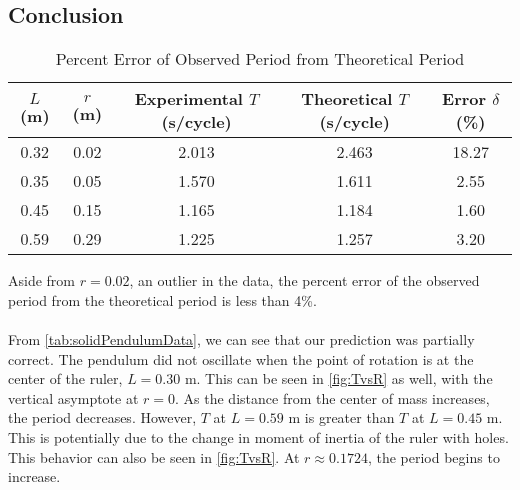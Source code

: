 \documentclass[article, 12pt]{article}
\begin{document}
\subsection{Conclusion}
\begin{table}[H]
    \centering
    \begin{tabular}{|c|c|c|c|c|}
        \hline
        $L$ (m) & $r$ (m) & Experimental $T$ (s/cycle) & Theoretical $T$ (s/cycle) & Error $\delta$ (\%) \\
        \hline
        0.32 & 0.02 & 2.013 & 2.463 & 18.27 \\
        0.35 & 0.05 & 1.570 & 1.611 & 2.55 \\
        0.45 & 0.15 & 1.165 & 1.184 & 1.60 \\
        0.59 & 0.29 & 1.225 & 1.257 & 3.20 \\
        \hline
    \end{tabular}
    \caption{Percent Error of Observed Period from Theoretical Period}
    \label{tab:percentError2}
\end{table}
Aside from $r=0.02$, an outlier in the data, the percent error of the observed period from the theoretical period is less than 4\%. \\
\\
From \autoref{tab:solidPendulumData}, we can see that our prediction was partially correct. The pendulum did not oscillate when the point of rotation is at the center of the ruler, $L=0.30 \text{ m}$. This can be seen in \autoref{fig:TvsR} as well, with the vertical asymptote at $r=0$. As the distance from the center of mass increases, the period decreases. However, $T$ at $L=0.59 \text{ m}$ is greater than $T$ at $L=0.45 \text{ m}$. This is potentially due to the change in moment of inertia of the ruler with holes. This behavior can also be seen in \autoref{fig:TvsR}. At $r\approx 0.1724$, the period begins to increase. 
\end{document}
